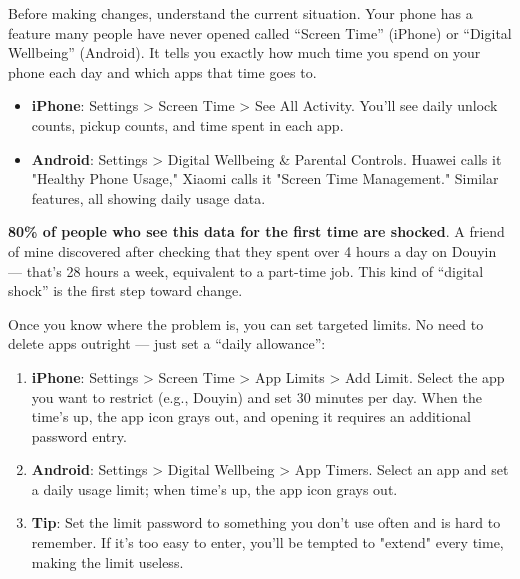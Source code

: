 


Before making changes, understand the current situation. Your phone has a feature many people have never opened called “Screen Time” (iPhone) or “Digital Wellbeing” (Android). It tells you exactly how much time you spend on your phone each day and which apps that time goes to.

\begin{itemize}
  \item \textbf{iPhone}: Settings > Screen Time > See All Activity. You'll see daily unlock counts, pickup counts, and time spent in each app.
  \item \textbf{Android}: Settings > Digital Wellbeing \& Parental Controls. Huawei calls it "Healthy Phone Usage," Xiaomi calls it "Screen Time Management." Similar features, all showing daily usage data.
\end{itemize}

\textbf{80\% of people who see this data for the first time are shocked}. A friend of mine discovered after checking that they spent over 4 hours a day on Douyin — that's 28 hours a week, equivalent to a part-time job. This kind of “digital shock” is the first step toward change.


Once you know where the problem is, you can set targeted limits. No need to delete apps outright — just set a “daily allowance”:

\begin{enumerate}
  \item \textbf{iPhone}: Settings > Screen Time > App Limits > Add Limit. Select the app you want to restrict (e.g., Douyin) and set 30 minutes per day. When the time's up, the app icon grays out, and opening it requires an additional password entry.
  \item \textbf{Android}: Settings > Digital Wellbeing > App Timers. Select an app and set a daily usage limit; when time's up, the app icon grays out.
  \item \textbf{Tip}: Set the limit password to something you don't use often and is hard to remember. If it's too easy to enter, you'll be tempted to "extend" every time, making the limit useless.
\end{enumerate}

